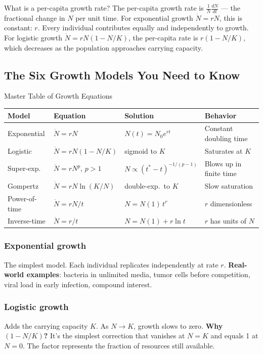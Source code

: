 \documentclass[11pt]{article}
\begin{document}
\begin{intuitionbox}{What is a per-capita growth rate?}
The per-capita growth rate is $\frac{1}{N}\frac{dN}{dt}$ --- the fractional change in $N$ per unit time. For exponential growth $\dot N = rN$, this is constant: $r$. Every individual contributes equally and independently to growth. For logistic growth $\dot N = rN(1-N/K)$, the per-capita rate is $r(1-N/K)$, which decreases as the population approaches carrying capacity.
\end{intuitionbox}

\subsection{The Six Growth Models You Need to Know}

\begin{summarybox}{Master Table of Growth Equations}
\renewcommand{\arraystretch}{1.5}
\begin{tabular}{p{2.4cm}p{3.2cm}p{3.5cm}p{4.2cm}}
\toprule
\textbf{Model} & \textbf{Equation} & \textbf{Solution} & \textbf{Behavior}\\
\midrule
Exponential & $\dot N = rN$ & $N(t) = N_0 e^{rt}$ & Constant doubling time\\
Logistic & $\dot N = rN(1-N/K)$ & sigmoid to $K$ & Saturates at $K$\\
Super-exp.\ & $\dot N = rN^p,\,p>1$ & $N \propto (t^*-t)^{-1/(p-1)}$ & Blows up in finite time\\
Gompertz & $\dot N = rN\ln(K/N)$ & double-exp.\ to $K$ & Slow saturation\\
Power-of-time & $\dot N = rN/t$ & $N = N(1)\,t^r$ & $r$ dimensionless\\
Inverse-time & $\dot N = r/t$ & $N = N(1) + r\ln t$ & $r$ has units of $N$\\
\bottomrule
\end{tabular}
\end{summarybox}

\subsubsection{Exponential growth} The simplest model. Each individual replicates independently at rate $r$. \textbf{Real-world examples}: bacteria in unlimited media, tumor cells before competition, viral load in early infection, compound interest.

\subsubsection{Logistic growth} Adds the carrying capacity $K$. As $N \to K$, growth slows to zero. \textbf{Why $(1 - N/K)$?} It's the simplest correction that vanishes at $N = K$ and equals 1 at $N = 0$. The factor represents the fraction of resources still available.
\end{document}
